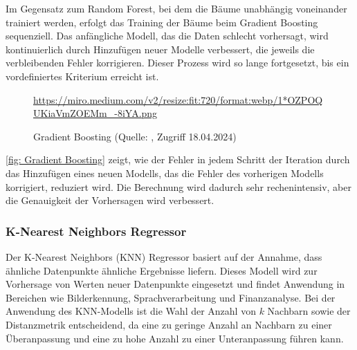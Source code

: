 Im Gegensatz zum Random Forest, bei dem die Bäume unabhängig voneinander trainiert werden, erfolgt das Training der Bäume beim Gradient Boosting sequenziell. Das anfängliche Modell, das die Daten schlecht vorhersagt, wird kontinuierlich durch Hinzufügen neuer Modelle verbessert, die jeweils die verbleibenden Fehler korrigieren. Dieser Prozess wird so lange fortgesetzt, bis ein vordefiniertes Kriterium erreicht ist.

\begin{figure}[H]
    \centering
    \urldef{\myurl}\url{https://miro.medium.com/v2/resize:fit:720/format:webp/1*OZPOQUKiaVmZOEMm_-8iYA.png}
    \caption[Gradient Boosting]{Gradient Boosting (Quelle: \protect\myurl{}, Zugriff 18.04.2024)}
    \label{fig: Gradient Boosting}
\end{figure}

\autoref{fig: Gradient Boosting} zeigt, wie der Fehler in jedem Schritt der Iteration durch das Hinzufügen eines neuen Modells, das die Fehler des vorherigen Modells korrigiert, reduziert wird. Die Berechnung wird dadurch sehr rechenintensiv, aber die Genauigkeit der Vorhersagen wird verbessert.

\subsubsection{K-Nearest Neighbors Regressor}
Der K-Nearest Neighbors (KNN) Regressor basiert auf der Annahme, dass ähnliche Datenpunkte ähnliche Ergebnisse liefern. Dieses Modell wird zur Vorhersage von Werten neuer Datenpunkte eingesetzt und findet Anwendung in Bereichen wie Bilderkennung, Sprachverarbeitung und Finanzanalyse. Bei der Anwendung des KNN-Modells ist die Wahl der Anzahl von \(k\) Nachbarn sowie der Distanzmetrik entscheidend, da eine zu geringe Anzahl an Nachbarn zu einer Überanpassung und eine zu hohe Anzahl zu einer Unteranpassung führen kann.

